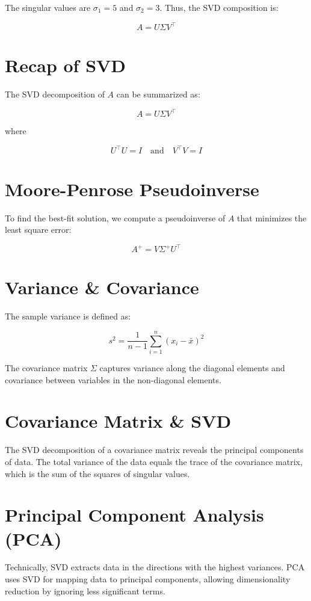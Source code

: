 \documentclass{ximera}
\begin{document}
\begin{problem}
\begin{problem}
The singular values are \(\sigma_1 = 5\) and \(\sigma_2 = 3\). Thus, the SVD composition is:

\[
A = U \Sigma V^\top
\]

\section{Recap of SVD}
The SVD decomposition of \(A\) can be summarized as:

\[
A = U \Sigma V^\top
\]

where

\[
U^\top U = I \quad \text{and} \quad V^\top V = I
\]

\section{Moore-Penrose Pseudoinverse}
To find the best-fit solution, we compute a pseudoinverse of \(A\) that minimizes the least square error:

\[
A^+ = V \Sigma^+ U^\top
\]

\section{Variance \& Covariance}
The sample variance is defined as:

\[
s^2 = \frac{1}{n-1} \sum_{i=1}^n (x_i - \bar{x})^2
\]

The covariance matrix \(\Sigma\) captures variance along the diagonal elements and covariance between variables in the non-diagonal elements.

\section{Covariance Matrix \& SVD}
The SVD decomposition of a covariance matrix reveals the principal components of data. The total variance of the data equals the trace of the covariance matrix, which is the sum of the squares of singular values.

\section{Principal Component Analysis (PCA)}
Technically, SVD extracts data in the directions with the highest variances. PCA uses SVD for mapping data to principal components, allowing dimensionality reduction by ignoring less significant terms.


\end{problem}
\end{problem}
\end{document}
